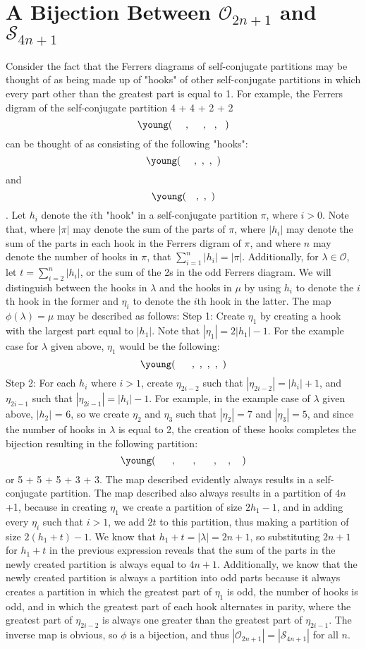 \documentclass[11pt]{article}
\begin{document}
\section{A Bijection Between $\mathcal{O}_{2n+1}$ and $\mathcal{S}_{4n+1}$}
 Consider the fact that the Ferrers diagrams of self-conjugate partitions may be thought of as being made up of "hooks" of other self-conjugate partitions in which every part other than the greatest part is equal to 1. For example, the Ferrers digram of the self-conjugate partition 4 + 4 + 2 + 2
\[\young(~~~~,~~~~,~~,~~)\]
can be thought of as consisting of the following "hooks":
\[\young(~~~~,~,~,~)\] and \[\young(~~~,~,~)\].
Let $h_i$ denote the $i$th "hook" in a self-conjugate partition $\pi$, where $i > 0$. Note that, where $|\pi|$ may denote the sum of the parts of $\pi$, where $|h_i|$ may denote the sum of the parts in each hook in the Ferrers digram of $\pi$, and where $n$ may denote the number of hooks in $\pi$, that $\sum\limits_{i=1}^{n}|h_i| = |\pi|$. Additionally, for $\lambda \in \mathcal{O}$, let $t = \sum\limits_{i=2}^{n}|h_i|$, or the sum of the 2s in the odd Ferrers diagram. We will distinguish between the hooks in $\lambda$ and the hooks in $\mu$ by using $h_i$ to denote the $i$th hook in the former and $\eta_i$ to denote the $i$th hook in the latter. The map $\phi(\lambda) = \mu$ may be described as follows:
\newline
\linebreak
\linebreak
Step 1: Create $\eta_1$ by creating a hook with the largest part equal to $|h_1|$. Note that $|\eta_1| = 2|h_1| - 1$. For the example case for $\lambda$ given above, $\eta_1$ would be the following:
\[\young(~~~~~,~,~,~,~)\]
Step 2: For each $h_i$ where $i > 1$, create $\eta_{2i-2}$ such that $|\eta_{2i-2}| = |h_i|+1$, and $\eta_{2i-1}$ such that $|\eta_{2i-1}| = |h_i|-1$. For example, in the example case of $\lambda$ given above, $|h_2|$ = 6, so we create $\eta_2$ and $\eta_3$ such that $|\eta_2| = 7$ and $|\eta_3| = 5$, and since the number of hooks in $\lambda$ is equal to 2, the creation of these hooks completes the bijection resulting in the following partition:
\[\young(~~~~~,~~~~~,~~~~~,~~~,~~~)\]
or 5 + 5 + 5 + 3 + 3. The map described evidently always results in a self-conjugate partition. The map described also always results in a partition of 4$n$+1, because in creating $\eta_1$ we create a partition of size $2h_1 - 1$, and in adding every $\eta_i$ such that $i >1$, we add $2t$ to this partition, thus making a partition of size $2(h_1 + t) - 1$. We know that $h_1 + t = |\lambda| = 2n + 1$, so substituting $2n + 1$ for $h_1 + t$ in the previous expression reveals that the sum of the parts in the newly created partition is always equal to $4n + 1$. Additionally, we know that the newly created partition is always a partition into odd parts because it always creates a partition in which the greatest part of $\eta_1$ is odd, the number of hooks is odd, and in which the greatest part of each hook alternates in parity, where the greatest part of $\eta_{2i-2}$ is always one greater than the greatest part of $\eta_{2i-1}$. The inverse map is obvious, so $\phi$ is a bijection, and thus $|\mathcal{O}_{2n+1}| = |\mathcal{S}_{4n+1}|$ for all $n$.
\end{document}
